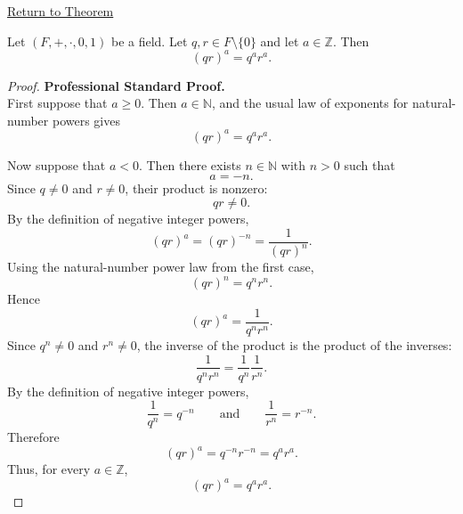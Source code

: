 \newpage
{}
\label{prf:power-of-product-in-field}

\begin{remark*}[Return]
\hyperref[thm:power-of-product-in-field]{Return to Theorem}
\end{remark*}

\begin{theorem*}
Let $(F,+,\cdot,0,1)$ be a field. Let $q,r\in F\setminus\{0\}$ and let
$a\in\mathbb{Z}$. Then
\[
(qr)^a=q^a r^a.
\]
\end{theorem*}

\begin{proof}
\textbf{Professional Standard Proof.}~\\
First suppose that $a\ge 0$. Then $a\in\mathbb{N}$, and the usual
law of exponents for natural-number powers gives
\[
(qr)^a=q^a r^a.
\]

Now suppose that $a<0$. Then there exists $n\in\mathbb{N}$ with
$n>0$ such that
\[
a=-n.
\]
Since $q\neq 0$ and $r\neq 0$, their product is nonzero:
\[
qr\neq 0.
\]
By the definition of negative integer powers,
\[
(qr)^a=(qr)^{-n}=\frac{1}{(qr)^n}.
\]
Using the natural-number power law from the first case,
\[
(qr)^n=q^n r^n.
\]
Hence
\[
(qr)^a=\frac{1}{q^n r^n}.
\]
Since $q^n\neq 0$ and $r^n\neq 0$, the inverse of the product is the
product of the inverses:
\[
\frac{1}{q^n r^n}=\frac{1}{q^n}\frac{1}{r^n}.
\]
By the definition of negative integer powers,
\[
\frac{1}{q^n}=q^{-n}
\qquad\text{and}\qquad
\frac{1}{r^n}=r^{-n}.
\]
Therefore
\[
(qr)^a=q^{-n}r^{-n}=q^a r^a.
\]
Thus, for every $a\in\mathbb{Z}$,
\[
(qr)^a=q^a r^a.
\]
\end{proof}

